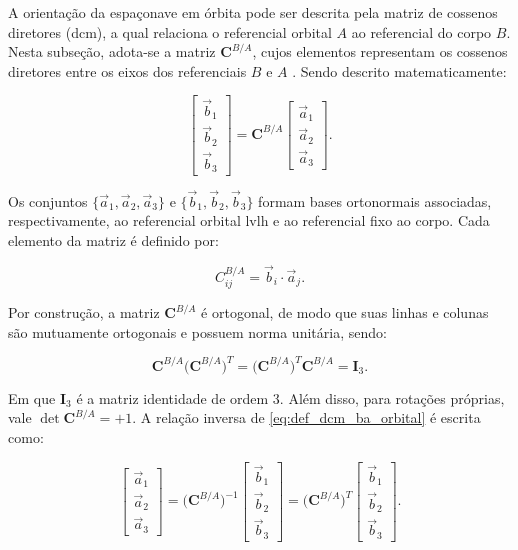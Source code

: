 A orientação da espaçonave em órbita pode ser descrita pela matriz de cossenos diretores (\gls{dcm}), a qual relaciona o referencial orbital $A$ ao referencial do corpo $B$. Nesta subseção, adota-se a matriz $\mathbf{C}^{B/A}$, cujos elementos representam os cossenos diretores entre os eixos dos referenciais $B$ e $A$ \cite{wie2008space}. 
Sendo descrito matematicamente:

\begin{equation}
\begin{bmatrix}
\vec{b}_1 \\
\vec{b}_2 \\
\vec{b}_3
\end{bmatrix}
=
\mathbf{C}^{B/A}
\begin{bmatrix}
\vec{a}_1 \\
\vec{a}_2 \\
\vec{a}_3
\end{bmatrix}.
\label{eq:def_dcm_ba_orbital}
\end{equation}

Os conjuntos $\{\vec{a}_1,\vec{a}_2,\vec{a}_3\}$ e $\{\vec{b}_1,\vec{b}_2,\vec{b}_3\}$ formam bases ortonormais associadas, respectivamente, ao referencial orbital \gls{lvlh} e ao referencial fixo ao corpo. Cada elemento da matriz é definido por:

\begin{equation}
C_{ij}^{B/A}=\vec{b}_i\cdot\vec{a}_j.
\label{eq_elemento_dcm_ba}
\end{equation}

Por construção, a matriz $\mathbf{C}^{B/A}$ é ortogonal, de modo que suas linhas e colunas são mutuamente ortogonais e possuem norma unitária, sendo:

\begin{equation}
\mathbf{C}^{B/A}\big(\mathbf{C}^{B/A}\big)^{T}
=
\big(\mathbf{C}^{B/A}\big)^{T}\mathbf{C}^{B/A}
=
\mathbf{I}_3.
\label{eq:ortonormalidade_C_ba}
\end{equation}

Em que $\mathbf{I}_3$ é a matriz identidade de ordem $3$. Além disso, para rotações próprias, vale $\det\mathbf{C}^{B/A}=+1$.
A relação inversa de \eqref{eq:def_dcm_ba_orbital} é escrita como:

\begin{equation}
\begin{bmatrix}
\vec{a}_1 \\
\vec{a}_2 \\
\vec{a}_3
\end{bmatrix}
=
\big(\mathbf{C}^{B/A}\big)^{-1}
\begin{bmatrix}
\vec{b}_1 \\
\vec{b}_2 \\
\vec{b}_3
\end{bmatrix}
=
\big(\mathbf{C}^{B/A}\big)^{T}
\begin{bmatrix}
\vec{b}_1 \\
\vec{b}_2 \\
\vec{b}_3
\end{bmatrix}.
\label{eq:relacao_inversa_dcm_ba}
\end{equation}

